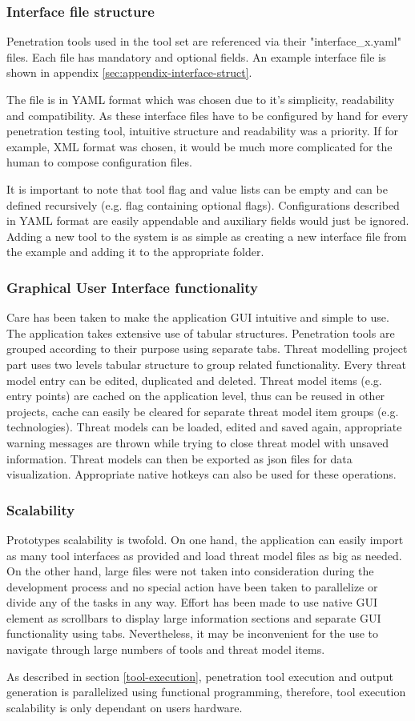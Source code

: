 	
	\subsubsection{Interface file structure}
	Penetration tools used in the tool set are referenced via their "interface\_x.yaml" files. Each file has mandatory and optional fields. An example interface file is shown in appendix \ref{sec:appendix-interface-struct}.
	
	The file is in YAML format which was chosen due to it's simplicity, readability and compatibility. As these interface files have to be configured by hand for every penetration testing tool, intuitive structure and readability was a priority. If for example, XML format was chosen, it would be much more complicated for the human to compose configuration files.
	
	It is important to note that tool flag and value lists can be empty and can be defined recursively (e.g. flag containing optional flags). Configurations described in YAML format are easily appendable and auxiliary fields would just be ignored.
	Adding a new tool to the system is as simple as creating a new interface file from the example and adding it to the appropriate folder.
	
	
	\subsubsection{Graphical User Interface functionality}
	Care has been taken to make the application GUI intuitive and simple to use. 
	The application takes extensive use of tabular structures. Penetration tools are grouped according to their purpose using separate tabs. Threat modelling project part uses two levels tabular structure to group related functionality. 
	Every threat model entry can be edited, duplicated and deleted. 
	Threat model items (e.g. entry points) are cached on the application level, thus can be reused in other projects, cache can easily be cleared for separate threat model item groups (e.g. technologies).
	Threat models can be loaded, edited and saved again, appropriate warning messages are thrown while trying to close threat model with unsaved information. Threat models can then be exported as json files for data visualization. Appropriate native hotkeys can also be used for these operations. 
	
	
	\subsubsection{Scalability}
	Prototypes scalability is twofold. On one hand, the application can easily import as many tool interfaces as provided and load threat model files as big as needed. On the other hand, large files were not taken into consideration during the development process and no special action have been taken to parallelize or divide any of the tasks in any way. Effort has been made to use native GUI element as scrollbars to display large information sections and separate GUI functionality using tabs. Nevertheless, it may be inconvenient for the use to navigate through large numbers of tools and threat model items.
	
	As described in section \ref{tool-execution}, penetration tool execution and output generation is parallelized using functional programming, therefore, tool execution scalability is only dependant on users hardware.
	

